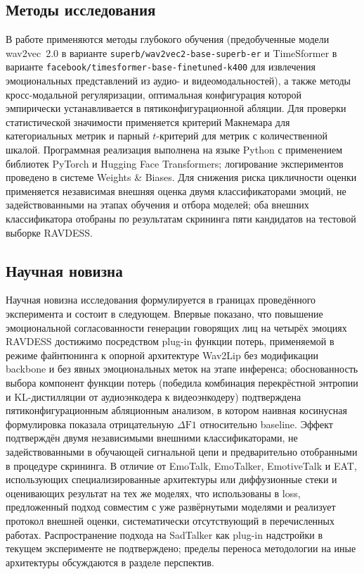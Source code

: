 \documentclass[a4paper, 12pt, oneside, openany]{article}
\begin{document}
\subsection{Методы исследования}

В работе применяются методы глубокого обучения (предобученные модели wav2vec~2.0 в варианте \texttt{superb/wav2vec2-base-superb-er} и TimeSformer в варианте \texttt{facebook/timesformer-base-finetuned-k400} для извлечения эмоциональных представлений из аудио- и видеомодальностей), а также методы кросс-модальной регуляризации, оптимальная конфигурация которой эмпирически устанавливается в пятиконфигурационной абляции. Для проверки статистической значимости применяется критерий Макнемара для категориальных метрик и парный $t$-критерий для метрик с количественной шкалой. Программная реализация выполнена на языке Python с применением библиотек PyTorch и Hugging Face Transformers; логирование экспериментов проведено в системе Weights \& Biases. Для снижения риска цикличности оценки применяется независимая внешняя оценка двумя классификаторами эмоций, не задействованными на этапах обучения и отбора моделей; оба внешних классификатора отобраны по результатам скрининга пяти кандидатов на тестовой выборке RAVDESS.

\subsection{Научная новизна}

Научная новизна исследования формулируется в границах проведённого эксперимента и состоит в следующем. Впервые показано, что повышение эмоциональной согласованности генерации говорящих лиц на четырёх эмоциях RAVDESS достижимо посредством plug-in функции потерь, применяемой в режиме файнтюнинга к опорной архитектуре Wav2Lip без модификации backbone и без явных эмоциональных меток на этапе инференса; обоснованность выбора компонент функции потерь (победила комбинация перекрёстной энтропии и KL-дистилляции от аудиоэнкодера к видеоэнкодеру) подтверждена пятиконфигурационным абляционным анализом, в котором наивная косинусная формулировка показала отрицательную $\Delta\text{F1}$ относительно baseline. Эффект подтверждён двумя независимыми внешними классификаторами, не задействованными в обучающей сигнальной цепи и предварительно отобранными в процедуре скрининга. В отличие от EmoTalk, EmoTalker, EmotiveTalk и EAT, использующих специализированные архитектуры или диффузионные стеки и оценивающих результат на тех же моделях, что использованы в loss, предложенный подход совместим с уже развёрнутыми моделями и реализует протокол внешней оценки, систематически отсутствующий в перечисленных работах. Распространение подхода на SadTalker как plug-in надстройки в текущем эксперименте не подтверждено; пределы переноса методологии на иные архитектуры обсуждаются в разделе перспектив.
\end{document}
